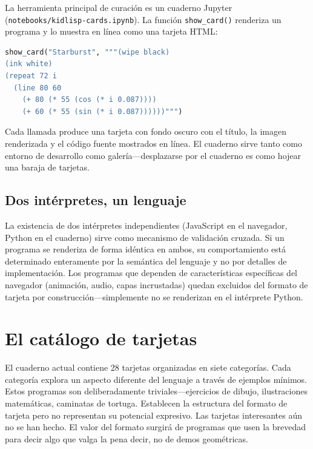\documentclass[10pt,letterpaper,twocolumn]{article}
\begin{document}
La herramienta principal de curaci\'on es un cuaderno Jupyter (\texttt{notebooks/kidlisp-cards.ipynb}). La funci\'on \texttt{show\_card()} renderiza un programa y lo muestra en l\'inea como una tarjeta HTML:

\begin{lstlisting}[language=python,basicstyle=\ttfamily\footnotesize]
show_card("Starburst", """(wipe black)
(ink white)
(repeat 72 i
  (line 80 60
    (+ 80 (* 55 (cos (* i 0.087))))
    (+ 60 (* 55 (sin (* i 0.087))))))""")
\end{lstlisting}

Cada llamada produce una tarjeta con fondo oscuro con el t\'itulo, la imagen renderizada y el c\'odigo fuente mostrados en l\'inea. El cuaderno sirve tanto como entorno de desarrollo como galer\'ia---desplazarse por el cuaderno es como hojear una baraja de tarjetas.

\subsection{Dos int\'erpretes, un lenguaje}

La existencia de dos int\'erpretes independientes (JavaScript en el navegador, Python en el cuaderno) sirve como mecanismo de validaci\'on cruzada. Si un programa se renderiza de forma id\'entica en ambos, su comportamiento est\'a determinado enteramente por la sem\'antica del lenguaje y no por detalles de implementaci\'on. Los programas que dependen de caracter\'isticas espec\'ificas del navegador (animaci\'on, audio, capas incrustadas) quedan excluidos del formato de tarjeta por construcci\'on---simplemente no se renderizan en el int\'erprete Python.


\section{El cat\'alogo de tarjetas}
\label{sec:catalog}

El cuaderno actual contiene 28 tarjetas organizadas en siete categor\'ias. Cada categor\'ia explora un aspecto diferente del lenguaje a trav\'es de ejemplos m\'inimos. Estos programas son deliberadamente triviales---ejercicios de dibujo, ilustraciones matem\'aticas, caminatas de tortuga. Establecen la estructura del formato de tarjeta pero no representan su potencial expresivo. Las tarjetas interesantes a\'un no se han hecho. El valor del formato surgir\'a de programas que usen la brevedad para decir algo que valga la pena decir, no de demos geom\'etricas.
\end{document}
